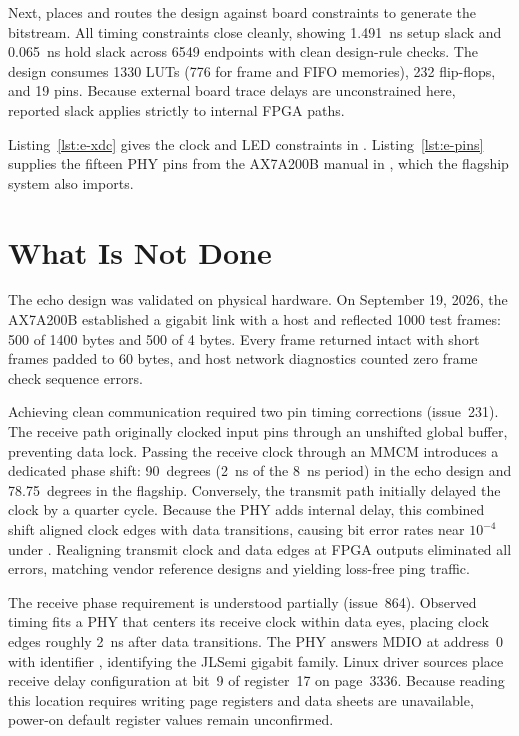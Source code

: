 \documentclass[journal,9pt]{IEEEtran}
\begin{document}
Next,  places and routes the design
against board constraints to generate the bitstream. All timing constraints
close cleanly, showing 1.491~ns setup slack and 0.065~ns hold slack across
6549 endpoints with clean design-rule checks. The design consumes 1330
LUTs (776 for frame and FIFO memories), 232 flip-flops, and 19 pins.
Because external board trace delays are unconstrained here, reported slack
applies strictly to internal FPGA paths.

Listing~\ref{lst:e-xdc} gives the clock and LED constraints in
. Listing~\ref{lst:e-pins} supplies the
fifteen PHY pins from the AX7A200B manual in ,
which the flagship system also imports.





\section{What Is Not Done}
\label{sec:e-not}

The echo design was validated on physical hardware. On September 19,
2026, the AX7A200B established a gigabit link with a host and reflected
1000 test frames: 500 of 1400 bytes and 500 of 4 bytes. Every frame
returned intact with short frames padded to 60 bytes, and host network
diagnostics counted zero frame check sequence errors.

Achieving clean communication required two pin timing corrections
(issue~231). The receive path originally clocked input pins through an
unshifted global buffer, preventing data lock. Passing the receive clock
through an MMCM introduces a dedicated phase shift: 90~degrees (2~ns of the
8~ns period) in the echo design and 78.75~degrees in the flagship.
Conversely, the transmit path initially delayed the clock by a quarter
cycle. Because the PHY adds internal delay, this combined shift aligned
clock edges with data transitions, causing bit error rates near
$10^{-4}$ under . Realigning transmit clock
and data edges at FPGA outputs eliminated all errors, matching vendor
reference designs and yielding loss-free ping traffic.

The receive phase requirement is understood partially (issue~864).
Observed timing fits a PHY that centers its receive clock within data eyes,
placing clock edges roughly 2~ns after data transitions. The PHY answers
MDIO at address~0 with identifier , identifying the JLSemi
gigabit family. Linux driver sources place receive delay configuration at
bit~9 of register~17 on page~3336. Because reading this location requires
writing page registers and data sheets are unavailable, power-on default
register values remain unconfirmed.
\end{document}
